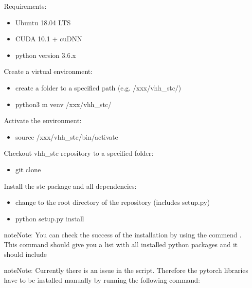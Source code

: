\documentclass[letterpaper,10pt,english,openany,oneside]{sphinxmanual}
\begin{document}
Requirements:
\begin{itemize}
\item {} 
Ubuntu 18.04 LTS

\item {} 
CUDA 10.1 + cuDNN

\item {} 
python version 3.6.x

\end{itemize}

Create a virtual environment:
\begin{itemize}
\item {} 
create a folder to a specified path (e.g. /xxx/vhh\_stc/)

\item {} 
python3 \sphinxhyphen{}m venv /xxx/vhh\_stc/

\end{itemize}

Activate the environment:
\begin{itemize}
\item {} 
source /xxx/vhh\_stc/bin/activate

\end{itemize}

Checkout vhh\_stc repository to a specified folder:
\begin{itemize}
\item {} 
git clone 

\end{itemize}

Install the stc package and all dependencies:
\begin{itemize}
\item {} 
change to the root directory of the repository (includes setup.py)

\item {} 
python setup.py install

\end{itemize}

\begin{sphinxadmonition}{note}{Note:}
You can check the success of the installation by using the commend . This command should give you a list with all installed python packages and it should include 
\end{sphinxadmonition}

\begin{sphinxadmonition}{note}{Note:}
Currently there is an issue in the  script. Therefore the pytorch libraries have to be installed manually by running the following command:
\end{sphinxadmonition}
\end{document}
